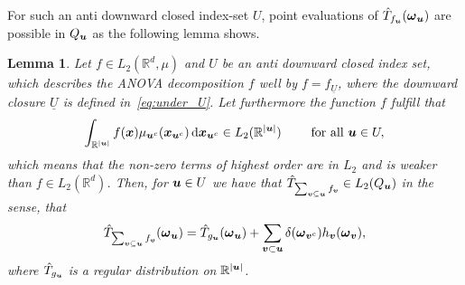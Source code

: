 \documentclass{article}
\renewcommand{\vec}[1]{\ensuremath \mathbf{\boldsymbol{#1}}}
\newcommand{\w}{\ensuremath{\vec \omega}}
\newcommand{\x}{\ensuremath{\vec x}}
\newcommand{\R}{\ensuremath{\mathbb{R}}}
\renewcommand{\d}{\, \mathrm{d}}
\newtheorem{lemma}[theorem]{Lemma}
\theoremstyle{definition}
\newenvironment{Lemma}{ \begin{lemma}\normalfont\slshape}{\end{lemma}}
\numberwithin{equation}{section}
\begin{document}
For such an anti downward closed index-set $U$, point evaluations of $\hat T_{f_{\vec u}}(\w_{\vec u})$ are possible in $Q_{\vec u}$ as the following lemma shows.  
\begin{Lemma}\label{lem:new}
%
Let $f\in L_2(\R^d,\mu) $ and $U$ be an anti downward closed index set, which describes the ANOVA decomposition $f$ well by $f = f_{\underline U}$, where the downward closure $\underline U$ is defined in~\eqref{eq:under_U}. Let furthermore the function $f$ fulfill that
\begin{equation}\label{eq:assumption}
\int_{\R^{|\vec u|}} f(\x)\mu_{\vec u^c}(\x_{\vec u^c}) \d \x_{\vec u^c} \in L_2(\R^{|\vec u|}) \qquad \text{ for all }\vec u\in U,
\end{equation}
which means that the non-zero terms of highest order are in $L_2$ and is weaker than $f\in L_2(\R^d)$. 
Then, for $\vec u \in U$ we have that $\hat T_{\sum_{\vec v \subseteq \vec u }f_{\vec v}} \in L_2(Q_{\vec u})$
in the sense, that 
\begin{equation}\label{eq:hat T_u}\hat T_{\sum_{\vec v \subseteq \vec u }f_{\vec v}}(\w_{\vec u}) = \hat T_{g_\vec u}(\w_{\vec u}) + \sum_{\vec v\subset \vec u} \delta(\w_{\vec v^c}) h_{\vec v}(\w_{\vec v}),\end{equation}
where $\hat T_{g_\vec u}$ is a regular distribution on $\R^{|\vec u|}$.
 


\end{Lemma}
\end{document}
